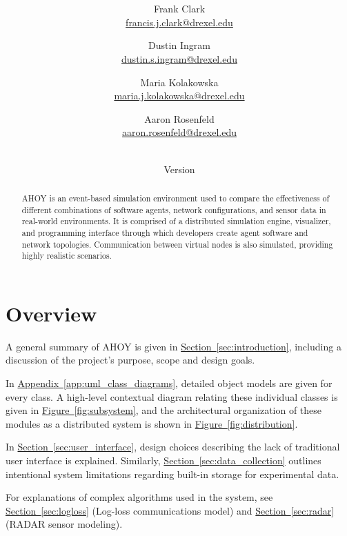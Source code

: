 \documentclass[titlepage]{article}
\title{\textbf{\mytitle}}
\author{
	Frank Clark \\\url{francis.j.clark@drexel.edu}
    \and Dustin Ingram \\\url{dustin.s.ingram@drexel.edu}
	\and Maria Kolakowska \\\url{maria.j.kolakowska@drexel.edu}
    \and Aaron Rosenfeld \\\url{aaron.rosenfeld@drexel.edu}
}
\date{\mydate\\Version \myversion}
\newcommand{\rrref}[2]{\hyperref[#2]{#1}}
\newcommand{\sref}[1]{\hyperref[#1]{Section~\ref*{#1}}}
\newcommand{\fref}[1]{\hyperref[#1]{Figure~\ref*{#1}}}
\newcommand{\aref}[1]{\hyperref[#1]{Appendix~\ref*{#1}}}
\begin{document}

\begin{figure*}
    \centering
    \scalebox{0.8}{}
    \vspace{-4em}
\end{figure*}

\maketitle

\begin{abstract}
AHOY is an event-based simulation environment used to compare the effectiveness of different combinations of software agents, network configurations, and sensor data in real-world environments.  It is comprised of a distributed simulation engine, visualizer, and programming interface through which developers create agent software and network topologies.  Communication between virtual nodes is also simulated, providing highly realistic scenarios.
\end{abstract}

\setcounter{tocdepth}{4}
\tableofcontents
\label{toc}
\pagebreak
\listoffigures
\label{lof}
\pagebreak
{}

\section{Overview}
A general summary of AHOY is given in \sref{sec:introduction}, including a discussion of the project's purpose, scope and design goals.

In \aref{app:uml_class_diagrams}, detailed object models are given for every class. A high-level contextual diagram relating these individual classes is given in \fref{fig:subsystem}, and the architectural organization of these modules as a distributed system is shown in \fref{fig:distribution}.

In \sref{sec:user_interface}, design choices describing the lack of traditional user interface is explained. Similarly, \sref{sec:data_collection} outlines intentional system limitations regarding built-in storage for experimental data. 

For explanations of complex algorithms used in the system, see \sref{sec:logloss} (Log-loss communications model) and \sref{sec:radar} (RADAR sensor modeling). 
\end{document}
